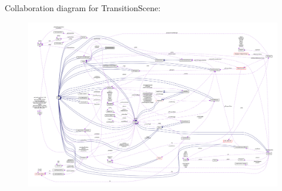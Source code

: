 Collaboration diagram for Transition\+Scene\+:
\nopagebreak
\begin{figure}[H]
\begin{center}
\leavevmode
\includegraphics[width=350pt]{classTransitionScene__coll__graph}
\end{center}
\end{figure}
